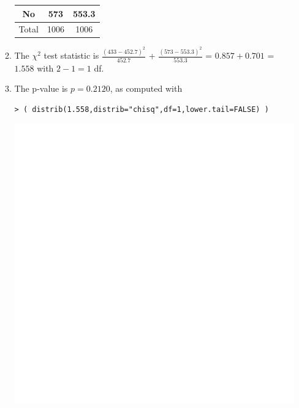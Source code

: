\documentclass[10pt,openany]{book}\usepackage[]{graphicx}\usepackage[]{color}
\makeatletter
\newenvironment{kframe}{%
 \def\at@end@of@kframe{}%
 \ifinner\ifhmode%
  \def\at@end@of@kframe{\end{minipage}}%
  \begin{minipage}{\columnwidth}%
 \fi\fi%
 \def\FrameCommand##1{\hskip\@totalleftmargin \hskip-\fboxsep
 \colorbox{shadecolor}{##1}\hskip-\fboxsep
     \hskip-\linewidth \hskip-\@totalleftmargin \hskip\columnwidth}%
 \MakeFramed {\advance\hsize-\width
   \@totalleftmargin\z@ \linewidth\hsize
   \@setminipage}}%
 {\par\unskip\endMakeFramed%
 \at@end@of@kframe}
\newenvironment{knitrout}{}{} %
\makeatother
\begin{document}
\begin{itemize}
\begin{enumerate}
\begin{center}
\begin{tabular}{ccc}
            No  & 573 & 553.3 \\
            \hline
            Total & 1006 & 1006 \\
            \hline\hline
          \end{tabular}
        \end{center}
      \item The $\chi^{2}$ test statistic is $\frac{(433-452.7)^{2}}{452.7}$ + $\frac{(573-553.3)^{2}}{553.3}$ = $0.857+0.701$ = $1.558$ with $2-1=1$ df.
      \item The p-value is $p=0.2120$, as computed with
\begin{knitrout}
\color{fgcolor}\begin{kframe}
\begin{verbatim}
> ( distrib(1.558,distrib="chisq",df=1,lower.tail=FALSE) )
\end{verbatim}


{\ttfamily\noindent\bfseries\color{errorcolor}{Error in plot.window(...): need finite 'ylim' values}}\end{kframe}

{\centering \includegraphics[width=.4\linewidth]{Figs/unnamed-chunk-400-1} 

}




\end{knitrout}
\end{enumerate}
\end{itemize}
\end{document}
